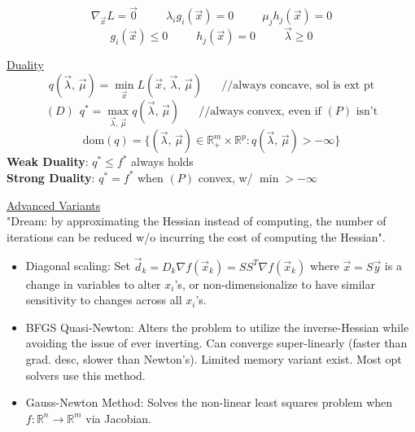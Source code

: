 \documentclass[twocolumn,12pt]{article}    %
\newcommand \hfive {\hspace{5pt}}
\begin{document}
\begin{equation*}
    \nabla_{\vec{x}}L = \vec{0} \hspace{30pt} \lambda_ig_i(\vec{x}) = 0 \hspace{30pt} \mu_j h_j(\vec{x}) = 0
\end{equation*}
\begin{equation*}
    g_i(\vec{x}) \leq 0 \hspace{30pt} h_j(\vec{x}) = 0 \hspace{30pt}
    \vec{\lambda} \geq 0
\end{equation*}

\noindent \underline{Duality}
\begin{equation*}
    q(\vec{\lambda},\, \vec{\mu}) = \min_{\vec{x}} L(\vec{x},\, \vec{\lambda},\, \vec{\mu}) \hspace{20pt} //\text{always concave, sol is ext pt}
\end{equation*}
\begin{equation*}
    (D) \hfive q^* = \max_{\vec{\lambda},\, \vec{\mu}} q(\vec{\lambda},\, \vec{\mu}) \hspace{20pt} // \text{always convex, even if } (P) \text{ isn't}
\end{equation*}
\begin{equation*}
    \text{dom} (q) = \{ (\vec{\lambda},\, \vec{\mu}) \in \mathds{R}_+^m \times \mathds{R}^p : q(\vec{\lambda},\, \vec{\mu}) > -\infty \}
\end{equation*}
\textbf{Weak Duality}: \(q^* \leq f^*\) always holds\\
\textbf{Strong Duality}: \(q^* =f^*\) when \((P)\) convex, w/ \(\min > - \infty\)


\noindent\underline{Advanced Variants}\\
"Dream: by approximating the Hessian instead of computing, the number of iterations can be reduced w/o incurring the cost of computing the Hessian".
\begin{itemize}
    \item Diagonal scaling: Set \(\vec{d}_k = D_k \nabla f(\vec{x}_k) = SS^T\nabla f(\vec{x}_k) \) where \(\vec{x} = S\vec{y}\) is a change in variables to  alter \(x_i\)'s, or non-dimensionalize to have similar sensitivity to changes across all \(x_i\)'s.
    \item  BFGS Quasi-Newton: Alters the problem to utilize the inverse-Hessian while avoiding the issue of ever inverting. Can converge super-linearly (faster than grad. desc, slower than Newton's). Limited memory variant exist. Most opt solvers use this method.
    \item Gauss-Newton Method: Solves the non-linear least squares problem when \(f: \mathds{R}^n \to \mathds{R}^m\) via Jacobian.
\end{itemize}
\end{document}
